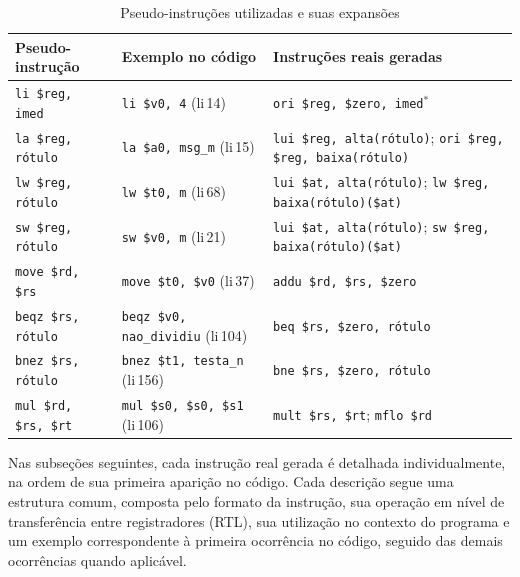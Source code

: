 \begin{table}[h]
\centering
\small
\begin{tabularx}{\textwidth}{|l|l|X|}
\hline
\textbf{Pseudo-instrução} &
\textbf{Exemplo no código} &
\textbf{Instruções reais geradas} \\
\hline

\texttt{li \$reg, imed} &
\texttt{li \$v0, 4} (li\,14) &
\texttt{ori \$reg, \$zero, imed}$^{*}$ \\
\hline

\texttt{la \$reg, rótulo} &
\texttt{la \$a0, msg\_m} (li\,15) &
\texttt{lui \$reg, alta(rótulo)}; \texttt{ori \$reg, \$reg, baixa(rótulo)} \\
\hline

\texttt{lw \$reg, rótulo} &
\texttt{lw \$t0, m} (li\,68) &
\texttt{lui \$at, alta(rótulo)}; \texttt{lw \$reg, baixa(rótulo)(\$at)} \\
\hline

\texttt{sw \$reg, rótulo} &
\texttt{sw \$v0, m} (li\,21) &
\texttt{lui \$at, alta(rótulo)}; \texttt{sw \$reg, baixa(rótulo)(\$at)} \\
\hline

\texttt{move \$rd, \$rs} &
\texttt{move \$t0, \$v0} (li\,37) &
\texttt{addu \$rd, \$rs, \$zero} \\
\hline

\texttt{beqz \$rs, rótulo} &
\texttt{beqz \$v0, nao\_dividiu} (li\,104) &
\texttt{beq \$rs, \$zero, rótulo} \\
\hline

\texttt{bnez \$rs, rótulo} &
\texttt{bnez \$t1, testa\_n} (li\,156) &
\texttt{bne \$rs, \$zero, rótulo} \\
\hline

\texttt{mul \$rd, \$rs, \$rt} &
\texttt{mul \$s0, \$s0, \$s1} (li\,106) &
\texttt{mult \$rs, \$rt}; \texttt{mflo \$rd} \\
\hline

\end{tabularx}
\caption{Pseudo-instruções utilizadas e suas expansões}
\label{tab:pseudo}
\end{table}

Nas subseções seguintes, cada instrução real gerada é detalhada individualmente, na ordem de sua primeira aparição no código. Cada descrição segue uma estrutura comum, composta pelo formato da instrução, sua operação em nível de transferência entre registradores (RTL), sua utilização no contexto do programa e um exemplo correspondente à primeira ocorrência no código, seguido das demais ocorrências quando aplicável.

